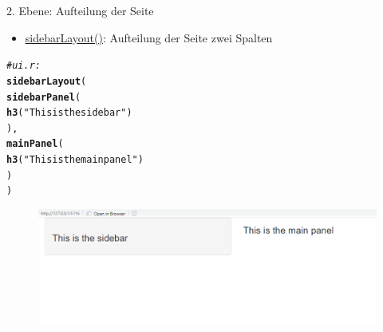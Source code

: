 \documentclass[xcolor=dvipsnames]{beamer}\usepackage[]{graphicx}\usepackage[]{color}
\makeatletter
\newcommand{\hlstr}[1]{\textcolor[rgb]{0.192,0.494,0.8}{#1}}%
\newcommand{\hlcom}[1]{\textcolor[rgb]{0.678,0.584,0.686}{\textit{#1}}}%
\newcommand{\hlstd}[1]{\textcolor[rgb]{0.345,0.345,0.345}{#1}}%
\newcommand{\hlkwd}[1]{\textcolor[rgb]{0.737,0.353,0.396}{\textbf{#1}}}%
\newenvironment{kframe}{%
 \def\at@end@of@kframe{}%
 \ifinner\ifhmode%
  \def\at@end@of@kframe{\end{minipage}}%
  \begin{minipage}{\columnwidth}%
 \fi\fi%
 \def\FrameCommand##1{\hskip\@totalleftmargin \hskip-\fboxsep
 \colorbox{shadecolor}{##1}\hskip-\fboxsep
     \hskip-\linewidth \hskip-\@totalleftmargin \hskip\columnwidth}%
 \MakeFramed {\advance\hsize-\width
   \@totalleftmargin\z@ \linewidth\hsize
   \@setminipage}}%
 {\par\unskip\endMakeFramed%
 \at@end@of@kframe}
\newenvironment{knitrout}{}{} %
\makeatother
\begin{document}
\begin{frame}[fragile]{2. Ebene: Aufteilung der Seite}
  \begin{itemize}
     \item \href{https://www.bioinformatics.babraham.ac.uk/shiny/Intro_to_Shiny_course/examples/04.1_layouts/}{\underline{sidebarLayout()}}: Aufteilung der Seite zwei Spalten
  \end{itemize}
\begin{knitrout}\small
{}\color{fgcolor}\begin{kframe}
\begin{alltt}
\hlcom{#ui.r:}
\hlkwd{sidebarLayout}\hlstd{(}
  \hlkwd{sidebarPanel}\hlstd{(}
    \hlkwd{h3}\hlstd{(}\hlstr{"This is the sidebar"}\hlstd{)}
  \hlstd{),}
  \hlkwd{mainPanel}\hlstd{(}
    \hlkwd{h3}\hlstd{(}\hlstr{"This is the main panel"}\hlstd{)}
  \hlstd{)}
\hlstd{)}
\end{alltt}
\end{kframe}
\end{knitrout}
  \begin{figure}
  	\centering
  	\includegraphics[width=1\textwidth]{figure/sidebarLayout.png}
  \end{figure}  
\end{frame}
\end{document}
